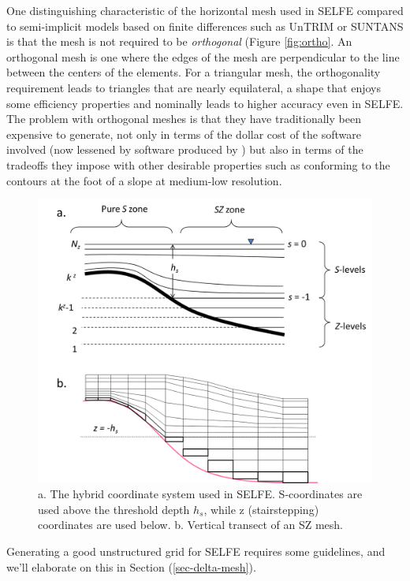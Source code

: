 One distinguishing characteristic of the horizontal mesh used in SELFE compared to 
semi-implicit models based on finite differences such as UnTRIM or SUNTANS is that the mesh is not 
required to be {\em orthogonal} (Figure \ref{fig:ortho}. An orthogonal mesh is one where the edges of the mesh are 
perpendicular to the line between the centers of the elements.  
For a triangular mesh, the orthogonality requirement leads to triangles that are nearly equilateral, 
a shape that enjoys some efficiency properties and nominally leads to higher accuracy even in SELFE. The
problem with orthogonal meshes is that they have traditionally
been expensive to generate, not only in terms of the dollar cost of the software involved 
(now lessened by software produced by \cite{Holleman13}) but also 
in terms of the tradeoffs they impose with other desirable properties such as conforming to the contours
at the foot of a slope at medium-low resolution. 



\begin{figure}
	\centering
		\includegraphics[scale=0.5]{image/vgrid}
	\caption{a. The hybrid coordinate system used in SELFE. S-coordinates are used above the threshold depth $h_s$,
	         while z (stairstepping) coordinates are used below. b. Vertical transect of an SZ mesh.}
	\label{fig:vgrid}
\end{figure}

Generating a good unstructured grid for SELFE requires some guidelines, and we'll elaborate on this in Section (\ref{sec-delta-mesh}). 

